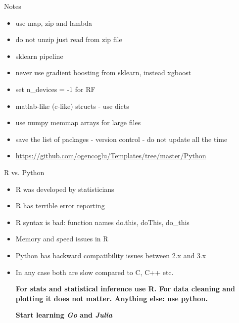 \documentclass{beamer}
\begin{document}
\begin{frame}{Notes}

	\begin{itemize}
		\item {use map, zip and lambda} \pause
		\item {do not unzip just read from zip file}\pause
		\item {sklearn pipeline}\pause
		\item {never use gradient boosting from sklearn, instead xgboost}\pause
		\item {set n\_devices = -1 for RF}\pause
		\item {matlab-like (c-like) structs - use dicts}\pause
		\item {use numpy memmap arrays for large files}\pause
		\item {save the list of packages - version control - do not update all the time}\pause
		\item {\url{https://github.com/ogencoglu/Templates/tree/master/Python}}
	\end{itemize}
	
\end{frame}

\begin{frame}{R vs. Python}
	\begin{itemize}

	\item {R was developed by statisticians}\pause
	\item {R has terrible error reporting}\pause
	\item {R syntax is bad: function names do.this, doThis, do\_this}\pause
	\item {Memory and speed issues in R}\pause
	\vspace{0.3cm}
	
	\item {Python has backward compatibility issues between 2.x and 3.x}\pause
	\item {In any case both are slow compared to C, C++ etc.}\pause
	
	\vspace{0.3cm}
	\textbf{For stats and statistical inference use R. For data cleaning and plotting it does not matter. Anything else: use python. \\} \pause
	\centerline{\textbf{Start learning \textit{Go} and \textit{Julia}}}
	\end{itemize}
\end{frame}
\end{document}
